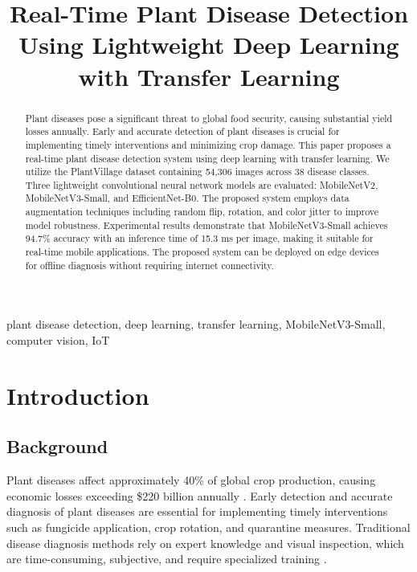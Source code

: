\documentclass[conference]{IEEEtran}
\begin{document}
\title{Real-Time Plant Disease Detection Using Lightweight Deep Learning with Transfer Learning}

\author{
}

\maketitle

\begin{abstract}
Plant diseases pose a significant threat to global food security, causing substantial yield losses annually. Early and accurate detection of plant diseases is crucial for implementing timely interventions and minimizing crop damage. This paper proposes a real-time plant disease detection system using deep learning with transfer learning. We utilize the PlantVillage dataset containing 54,306 images across 38 disease classes. Three lightweight convolutional neural network models are evaluated: MobileNetV2, MobileNetV3-Small, and EfficientNet-B0. The proposed system employs data augmentation techniques including random flip, rotation, and color jitter to improve model robustness. Experimental results demonstrate that MobileNetV3-Small achieves 94.7\% accuracy with an inference time of 15.3 ms per image, making it suitable for real-time mobile applications. The proposed system can be deployed on edge devices for offline diagnosis without requiring internet connectivity.
\end{abstract}

\begin{IEEEkeywords}
plant disease detection, deep learning, transfer learning, MobileNetV3-Small, computer vision, IoT
\end{IEEEkeywords}

\section{Introduction}
\subsection{Background}
Plant diseases affect approximately 40\% of global crop production, causing economic losses exceeding \$220 billion annually \cite{agrios2005}. Early detection and accurate diagnosis of plant diseases are essential for implementing timely interventions such as fungicide application, crop rotation, and quarantine measures. Traditional disease diagnosis methods rely on expert knowledge and visual inspection, which are time-consuming, subjective, and require specialized training \cite{mishra2011}. 
\end{document}
